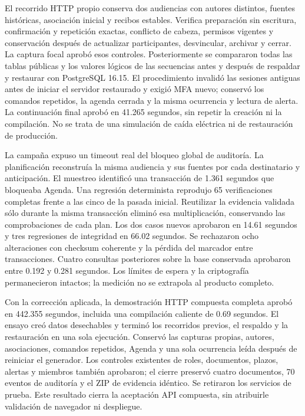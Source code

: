 El recorrido HTTP propio conserva dos audiencias con autores distintos, fuentes históricas, asociación inicial y recibos estables. Verifica preparación sin escritura, confirmación y repetición exactas, conflicto de cabeza, permisos vigentes y conservación después de actualizar participantes, desvincular, archivar y cerrar. La captura focal aprobó esos controles. Posteriormente se compararon todas las tablas públicas y los valores lógicos de las secuencias antes y después de respaldar y restaurar con PostgreSQL 16.15. El procedimiento invalidó las sesiones antiguas antes de iniciar el servidor restaurado y exigió MFA nuevo; conservó los comandos repetidos, la agenda cerrada y la misma ocurrencia y lectura de alerta. La continuación final aprobó en 41.265 segundos, sin repetir la creación ni la compilación. No se trata de una simulación de caída eléctrica ni de restauración de producción.

La campaña expuso un timeout real del bloqueo global de auditoría. La planificación reconstruía la misma audiencia y sus fuentes por cada destinatario y anticipación. El muestreo identificó una transacción de 1.361 segundos que bloqueaba Agenda. Una regresión determinista reprodujo 65 verificaciones completas frente a las cinco de la pasada inicial. Reutilizar la evidencia validada sólo durante la misma transacción eliminó esa multiplicación, conservando las comprobaciones de cada plan. Los dos casos nuevos aprobaron en 14.61 segundos y tres regresiones de integridad en 66.02 segundos. Se rechazaron ocho alteraciones con checksum coherente y la pérdida del marcador entre transacciones. Cuatro consultas posteriores sobre la base conservada aprobaron entre 0.192 y 0.281 segundos. Los límites de espera y la criptografía permanecieron intactos; la medición no se extrapola al producto completo.

Con la corrección aplicada, la demostración HTTP compuesta completa aprobó en 442.355 segundos, incluida una compilación caliente de 0.69 segundos. El ensayo creó datos desechables y terminó los recorridos previos, el respaldo y la restauración en una sola ejecución. Conservó las capturas propias, autores, asociaciones, comandos repetidos, Agenda y una sola ocurrencia leída después de reiniciar el generador. Los controles existentes de roles, documentos, plazos, alertas y miembros también aprobaron; el cierre preservó cuatro documentos, 70 eventos de auditoría y el ZIP de evidencia idéntico. Se retiraron los servicios de prueba. Este resultado cierra la aceptación API compuesta, sin atribuirle validación de navegador ni despliegue.

